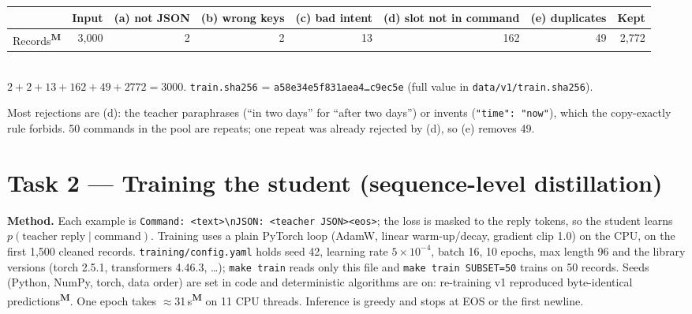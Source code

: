 \documentclass[10pt,a4paper]{article}
\newcommand{\code}[1]{\texttt{\small #1}}
\newcommand{\meas}{\textsuperscript{\textbf{M}}}
\begin{document}
\begin{center}\small
\begin{tabular}{lrrrrrrr}
\toprule
& Input & (a) not JSON & (b) wrong keys & (c) bad intent & (d) slot not in command & (e) duplicates & Kept\\
\midrule
Records\meas{} & 3,000 & 2 & 2 & 13 & 162 & 49 & 2,772\\
\bottomrule
\end{tabular}\\[2pt]
$2+2+13+162+49+2772 = 3000$. \quad \code{train.sha256} = \code{a58e34e5f831aea4\ldots c9ec5e} (full value in \code{data/v1/train.sha256}).
\end{center}
Most rejections are (d): the teacher paraphrases (``in two days'' for ``after two days'') or invents
(\code{"time": "now"}), which the copy-exactly rule forbids. 50 commands in the pool are repeats; one repeat was
already rejected by (d), so (e) removes 49.

\section{Task 2 --- Training the student (sequence-level distillation)}
\textbf{Method.} Each example is \code{Command: <text>\textbackslash nJSON: <teacher JSON><eos>}; the loss is
masked to the reply tokens, so the student learns $p(\text{teacher reply}\mid\text{command})$. Training uses a plain
PyTorch loop (AdamW, linear warm-up/decay, gradient clip 1.0) on the CPU, on the first 1,500 cleaned records.
\code{training/config.yaml} holds seed 42, learning rate $5\times10^{-4}$, batch 16, 10 epochs, max length 96 and
the library versions (torch 2.5.1, transformers 4.46.3, \ldots); \code{make train} reads only this file and
\code{make train SUBSET=50} trains on 50 records. Seeds (Python, NumPy, torch, data order) are set in code and
deterministic algorithms are on: re-training v1 reproduced byte-identical predictions\meas{}.
One epoch takes $\approx$31\,s\meas{} on 11 CPU threads. Inference is greedy and stops at EOS or the first newline.
\end{document}

